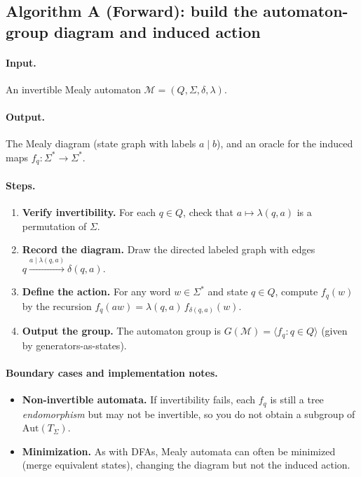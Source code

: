 \documentclass[11pt]{article}
\theoremstyle{definition}
\theoremstyle{plain}
\theoremstyle{remark}
\begin{document}
\subsection*{Algorithm A (Forward): build the automaton-group diagram and induced action}
\paragraph{Input.}
An invertible Mealy automaton $\mathcal M=(Q,\Sigma,\delta,\lambda)$.

\paragraph{Output.}
The Mealy diagram (state graph with labels $a\mid b$), and an oracle for the induced maps $f_q:\Sigma^*\to\Sigma^*$.

\paragraph{Steps.}
\begin{enumerate}[leftmargin=2.2em]
\item \textbf{Verify invertibility.} For each $q\in Q$, check that $a\mapsto \lambda(q,a)$ is a permutation of $\Sigma$.
\item \textbf{Record the diagram.} Draw the directed labeled graph with edges $q\xrightarrow{a\mid \lambda(q,a)}\delta(q,a)$.
\item \textbf{Define the action.} For any word $w\in\Sigma^*$ and state $q\in Q$, compute $f_q(w)$ by the recursion
$f_q(a w)=\lambda(q,a)\, f_{\delta(q,a)}(w)$.
\item \textbf{Output the group.} The automaton group is $G(\mathcal M)=\langle f_q:q\in Q\rangle$ (given by generators-as-states).
\end{enumerate}

\paragraph{Boundary cases and implementation notes.}
\begin{itemize}[leftmargin=2em]
\item \textbf{Non-invertible automata.} If invertibility fails, each $f_q$ is still a tree \emph{endomorphism} but may not be invertible,
so you do not obtain a subgroup of $\mathrm{Aut}(T_\Sigma)$.
\item \textbf{Minimization.} As with DFAs, Mealy automata can often be minimized (merge equivalent states), changing the diagram but not the induced action.
\end{itemize}
\end{document}
